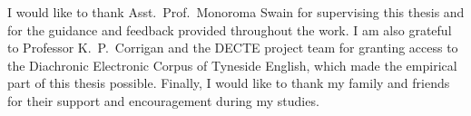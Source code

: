 
\cleardoubleoddpage%
\begin{acks*}
I would like to thank Asst.\ Prof.\ Monoroma Swain for supervising
this thesis and for the guidance and feedback provided throughout
the work. I am also grateful to Professor K.~P.\ Corrigan and the
DECTE project team for granting access to the Diachronic Electronic
Corpus of Tyneside English, which made the empirical part of this
thesis possible. Finally, I would like to thank my family and
friends for their support and encouragement during my studies.
\end{acks*}


